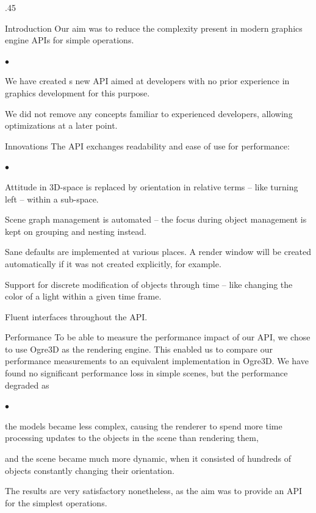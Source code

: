 \documentclass[final,hyperref={pdfpagelabels=true}]{beamer}
\newenvironment{smalllist}{\begin{list}{$\bullet$}{\itemsep 0cm \parskip 0pt}}{\end{list}}
\begin{document}
\begin{frame}[fragile]
\begin{columns}[t]
\begin{column}{.45\textwidth}
			\begin{block}{Introduction}
				Our aim was to reduce the complexity present in modern graphics engine APIs for simple operations.
				\begin{smalllist}
					\item We have created s new API aimed at developers with no prior experience in graphics development for this purpose.
					\item We did not remove any concepts familiar to experienced developers, allowing optimizations at a later point.
				\end{smalllist}

			\end{block}

			\begin{block}{Innovations}
				The API exchanges readability and ease of use for performance:
				\begin{smalllist}
					\item Attitude in 3D-space is replaced by orientation in relative terms -- like turning left -- within a sub-space.
					\item Scene graph management is automated -- the focus during object management is kept on grouping and nesting instead.
					\item Sane defaults are implemented at various places. A render window will be created automatically if it was not created explicitly, for example.
					\item Support for discrete modification of objects through time -- like changing the color of a light within a given time frame.
					\item Fluent interfaces throughout the API.
				\end{smalllist}
			\end{block}

			\begin{block}{Performance}
				To be able to measure the performance impact of our API, we chose to use Ogre3D as the rendering engine. This enabled us to compare our performance measurements to an equivalent implementation in Ogre3D. We have found no significant performance loss in simple scenes, but the performance degraded as
				\begin{smalllist}
					\item the models became less complex, causing the renderer to spend more time processing updates to the objects in the scene than rendering them,
					\item and the scene became much more dynamic, when it consisted of hundreds of objects constantly changing their orientation.
				\end{smalllist}
				The results are very satisfactory nonetheless, as the aim was to provide an API for the simplest operations.
			\end{block}


\end{column}
\end{columns}
\end{frame}
\end{document}
